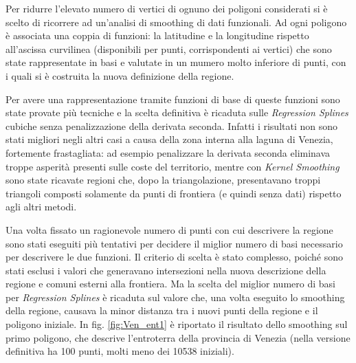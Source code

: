\documentclass[a4paper,11pt,twoside,openright]{book}							%
\begin{document}
Per ridurre l'elevato numero di vertici di ognuno dei poligoni considerati si è scelto di ricorrere ad un'analisi di smoothing di dati funzionali. Ad ogni poligono è associata una coppia di funzioni: la latitudine e la longitudine rispetto all'ascissa curvilinea (disponibili per punti, corrispondenti ai vertici) che sono state rappresentate in basi e valutate in un mumero molto inferiore di punti, con i quali si è costruita la nuova definizione della regione.

Per avere una rappresentazione tramite funzioni di base di queste funzioni sono state provate più tecniche e la scelta definitiva è ricaduta sulle \textit{Regression Splines} cubiche senza penalizzazione della derivata seconda. Infatti i risultati non sono stati migliori negli altri casi a causa della zona interna alla laguna di Venezia, fortemente frastagliata: ad esempio penalizzare la derivata seconda eliminava troppe asperità presenti sulle coste del territorio, mentre con \textit{Kernel Smoothing} sono state ricavate regioni che, dopo la triangolazione, presentavano troppi triangoli composti solamente da punti di frontiera (e quindi senza dati) rispetto agli altri metodi.

Una volta fissato un ragionevole numero di punti con cui descrivere la regione sono stati eseguiti più tentativi per decidere il miglior numero di basi necessario per descrivere le due funzioni. Il criterio di scelta è stato complesso, poiché sono stati esclusi i valori che generavano intersezioni nella nuova descrizione della regione e comuni esterni alla frontiera. Ma la scelta del miglior numero di basi per \textit{Regression Splines} è ricaduta sul valore che, una volta eseguito lo smoothing della regione, causava la minor distanza tra i nuovi punti della regione e il poligono iniziale. In fig. \ref{fig:Ven_ent1} è riportato il risultato dello smoothing sul primo poligono, che descrive l'entroterra della provincia di Venezia (nella versione definitiva ha 100 punti, molti meno dei 10538 iniziali).  
\end{document}
